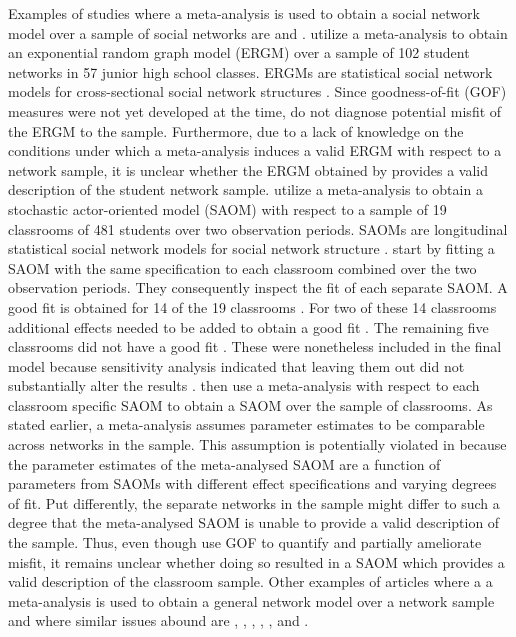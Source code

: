 \documentclass[a4paper, man, floatsintext]{apa6}
\begin{document}
Examples of studies where a meta-analysis is used to obtain a social network model over a sample of social networks are  and .  utilize a meta-analysis to obtain an exponential random graph model (ERGM) over a sample of 102 student networks in 57 junior high school classes. ERGMs are statistical social network models for cross-sectional social network structures \cite{lusher2013exponential}. Since goodness-of-fit (GOF) measures were not yet developed at the time,  do not diagnose potential misfit of the ERGM to the sample. Furthermore, due to a lack of knowledge on the conditions under which a meta-analysis induces a valid ERGM with respect to a network sample, it is unclear whether the ERGM obtained by  provides a valid description of the student network sample.  utilize a meta-analysis to obtain a stochastic actor-oriented model (SAOM) with respect to a sample of 19 classrooms of 481 students over two observation periods. SAOMs are longitudinal statistical social network models for social network structure \cite{snijders2001statistical}.  start by fitting a SAOM with the same specification to each classroom combined over the two observation periods. They consequently inspect the fit of each separate SAOM. A good fit is obtained for 14 of the 19 classrooms \cite{rambaran2020bullying}. For two of these 14 classrooms additional effects needed to be added to obtain a good fit \cite{rambaran2020bullying}. \clearpage \noindent The remaining five classrooms did not have a good fit \cite{rambaran2020bullying}. These were nonetheless included in the final model because sensitivity analysis indicated that leaving them out did not substantially alter the results \cite{rambaran2020bullying}.  then use a meta-analysis with respect to each classroom specific SAOM to obtain a SAOM over the sample of classrooms. As stated earlier, a meta-analysis assumes parameter estimates to be comparable across networks in the sample. This assumption is potentially violated in  because the parameter estimates of the meta-analysed SAOM are a function of parameters from SAOMs with different effect specifications and varying degrees of fit. Put differently, the separate networks in the sample might differ to such a degree that the meta-analysed SAOM is unable to provide a valid description of the sample. Thus, even though  use GOF to quantify and partially ameliorate misfit, it remains unclear whether doing so resulted in a SAOM which provides a valid description of the classroom sample. Other examples of articles where a a meta-analysis is used to obtain a general network model over a network sample and where similar issues abound are , , , , , and .   
\end{document}
